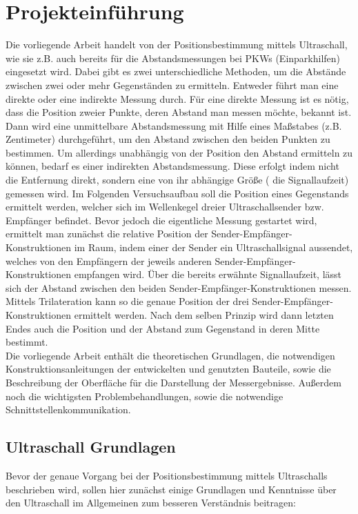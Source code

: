 
\chapter{Projekteinführung}
Die vorliegende Arbeit handelt von der Positionsbestimmung mittels Ultraschall, wie sie z.B. auch bereits für die Abstandsmessungen bei PKWs (Einparkhilfen) eingesetzt wird. Dabei gibt es zwei unterschiedliche Methoden, um die Abstände zwischen zwei oder mehr Gegenständen zu ermitteln. Entweder führt man eine direkte oder eine indirekte Messung durch. Für eine direkte Messung ist es nötig, dass die Position zweier Punkte, deren Abstand man messen möchte, bekannt ist. Dann wird eine unmittelbare Abstandsmessung mit Hilfe eines Maßstabes (z.B. Zentimeter) durchgeführt, um den Abstand zwischen den beiden Punkten zu bestimmen. Um allerdings unabhängig von der Position den Abstand ermitteln zu können, bedarf es einer indirekten Abstandsmessung. Diese erfolgt indem nicht die Entfernung direkt, sondern eine von ihr abhängige Größe ( die Signallaufzeit) gemessen wird. Im Folgenden Versuchsaufbau soll die Position eines Gegenstands ermittelt werden, welcher sich im Wellenkegel dreier Ultraschallsender bzw. Empfänger befindet. Bevor jedoch die eigentliche Messung gestartet wird, ermittelt man zunächst die relative Position der Sender-Empfänger-Konstruktionen im Raum, indem einer der Sender ein Ultraschallsignal aussendet, welches von den Empfängern der  jeweils anderen Sender-Empfänger-Konstruktionen empfangen wird. Über die bereits erwähnte Signallaufzeit, lässt sich der Abstand zwischen den beiden Sender-Empfänger-Konstruktionen messen. Mittels Trilateration kann so die genaue Position der drei Sender-Empfänger-Konstruktionen ermittelt werden. Nach dem selben Prinzip wird dann letzten Endes auch die Position und der Abstand zum Gegenstand in deren Mitte bestimmt.\\
Die vorliegende Arbeit enthält die theoretischen Grundlagen, die notwendigen Konstruktionsanleitungen der entwickelten und genutzten Bauteile, sowie die Beschreibung der Oberfläche für die Darstellung der Messergebnisse. Außerdem noch die wichtigsten Problembehandlungen, sowie die notwendige Schnittstellenkommunikation.


\section{Ultraschall Grundlagen}
Bevor der genaue Vorgang bei der Positionsbestimmung mittels Ultraschalls beschrieben wird, sollen hier zunächst einige Grundlagen und Kenntnisse über den Ultraschall im Allgemeinen zum besseren Verständnis beitragen:
